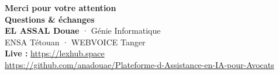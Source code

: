 \documentclass[aspectratio=169, t]{beamer}
\newcommand{\githubrepo}{\url{https://github.com/anadouae/Plateforme-d-Assistance-en-IA-pour-Avocats}}
\begin{document}
\begin{frame}
  \begin{center}
    \vspace{2.2cm}
    {\LARGE\bfseries\color{white} Merci pour votre attention}\\[0.5cm]
    {\large\bfseries\color{UAEAccentGold} Questions \& échanges}\\[0.8cm]
    {\normalsize\color{white!90}\textbf{EL ASSAL Douae} · Génie Informatique}\\[0.15cm]
    {\small\color{UAESkyBlue} ENSA Tétouan · WEBVOICE Tanger}\\[0.45cm]
    {\footnotesize\color{white!90}\textbf{Live :} \url{https://lexhub.space}}\\[0.15cm]
    {\scriptsize\color{white!70}\githubrepo}
  \end{center}
\end{frame}
\end{document}

